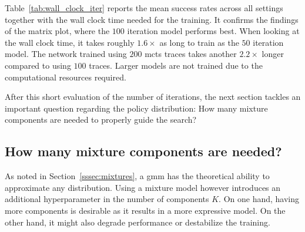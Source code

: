 \begin{table}[h]
 \centering
\caption[Training wall clock time for different iterations]{Wall clock times for different training iteration numbers in scenario 06. The mean evaluation success rate is shown below. The model using $100$ iterations has a higher evaluation success rate than both $50$ and $200$ iterations.}
\label{tab:wall_clock_iter}
\end{table}
Table~\ref{tab:wall_clock_iter} reports the mean success rates across all settings together with the wall clock time needed for the training.
It confirms the findings of the matrix plot, where the $100$ iteration model performs best. When looking at the wall clock time, it takes roughly $1.6 \times$ as long to train as the $50$ iteration model. The network trained using $200$ \gls{mcts} traces takes another $2.2 \times$ longer compared to using $100$ traces. Larger models are not trained due to the computational resources required.

After this short evaluation of the number of iterations, the next section tackles an important question regarding the policy distribution: How many mixture components are needed to properly guide the search?

\subsection{How many mixture components are needed?}\label{ssec:eval_of_components}
As noted in Section~\ref{sssec:mixtures}, a \gls{gmm} has the theoretical ability to approximate any distribution. Using a mixture model however introduces an additional hyperparameter in the number of components $K$. On one hand, having more components is desirable as it results in a more expressive model. On the other hand, it might also degrade performance or destabilize the training.

